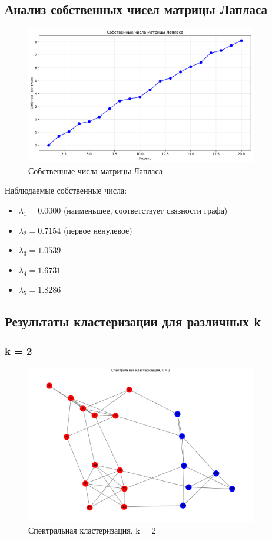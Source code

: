 \subsection*{Анализ собственных чисел матрицы Лапласа}

\begin{figure}[H]
    \centering
    \includegraphics[width=0.9\textwidth]{images/task1/eigenvalues.png}
    \caption{Собственные числа матрицы Лапласа}
\end{figure}

Наблюдаемые собственные числа:
\begin{itemize}
    \item $\lambda_1 = 0.0000$ (наименьшее, соответствует связности графа)
    \item $\lambda_2 = 0.7154$ (первое ненулевое)
    \item $\lambda_3 = 1.0539$
    \item $\lambda_4 = 1.6731$
    \item $\lambda_5 = 1.8286$
\end{itemize}

\subsection*{Результаты кластеризации для различных k}

\subsubsection*{k = 2}

\begin{figure}[H]
    \centering
    \includegraphics[width=0.9\textwidth]{images/task1/clustering_k2.png}
    \caption{Спектральная кластеризация, k = 2}
\end{figure}

